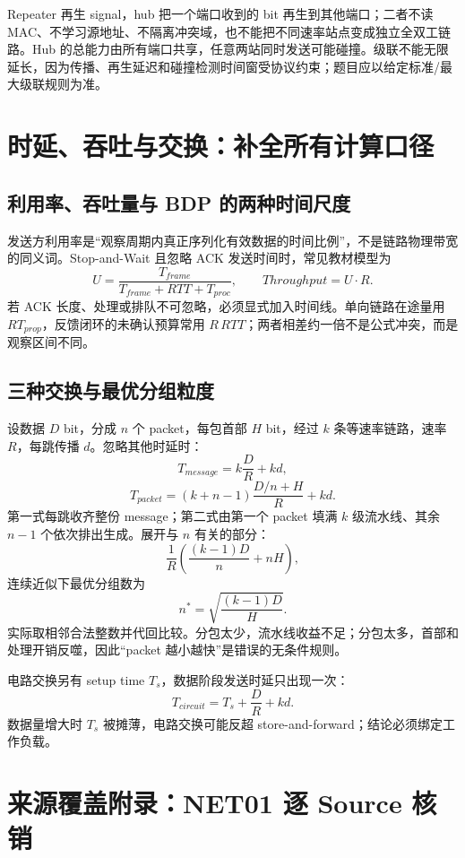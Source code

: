 \documentclass[UTF8,fontset=none,11pt,a4paper]{ctexart}
\begin{document}
Repeater 再生 signal，hub 把一个端口收到的 bit 再生到其他端口；二者不读 MAC、不学习源地址、不隔离冲突域，也不能把不同速率站点变成独立全双工链路。Hub 的总能力由所有端口共享，任意两站同时发送可能碰撞。级联不能无限延长，因为传播、再生延迟和碰撞检测时间窗受协议约束；题目应以给定标准/最大级联规则为准。

\section{时延、吞吐与交换：补全所有计算口径}

\subsection{利用率、吞吐量与 BDP 的两种时间尺度}

发送方利用率是“观察周期内真正序列化有效数据的时间比例”，不是链路物理带宽的同义词。Stop-and-Wait 且忽略 ACK 发送时间时，常见教材模型为
\[
U=\frac{T_{frame}}{T_{frame}+RTT+T_{proc}},
\qquad
Throughput=U\cdot R.
\]
若 ACK 长度、处理或排队不可忽略，必须显式加入时间线。单向链路在途量用 \(R T_{prop}\)，反馈闭环的未确认预算常用 \(R\,RTT\)；两者相差约一倍不是公式冲突，而是观察区间不同。

\subsection{三种交换与最优分组粒度}

设数据 \(D\) bit，分成 \(n\) 个 packet，每包首部 \(H\) bit，经过 \(k\) 条等速率链路，速率 \(R\)，每跳传播 \(d\)。忽略其他时延时：
\[
T_{message}=k\frac DR+kd,
\]
\[
T_{packet}=(k+n-1)\frac{D/n+H}{R}+kd.
\]
第一式每跳收齐整份 message；第二式由第一个 packet 填满 \(k\) 级流水线、其余 \(n-1\) 个依次排出生成。展开与 \(n\) 有关的部分：
\[
\frac1R\left(\frac{(k-1)D}{n}+nH\right),
\]
连续近似下最优分组数为
\[
n^*=\sqrt{\frac{(k-1)D}{H}}.
\]
实际取相邻合法整数并代回比较。分包太少，流水线收益不足；分包太多，首部和处理开销反噬，因此“packet 越小越快”是错误的无条件规则。

电路交换另有 setup time \(T_s\)，数据阶段发送时延只出现一次：
\[
T_{circuit}=T_s+\frac DR+kd.
\]
数据量增大时 \(T_s\) 被摊薄，电路交换可能反超 store-and-forward；结论必须绑定工作负载。

\section{来源覆盖附录：NET01 逐 Source 核销}
\end{document}
